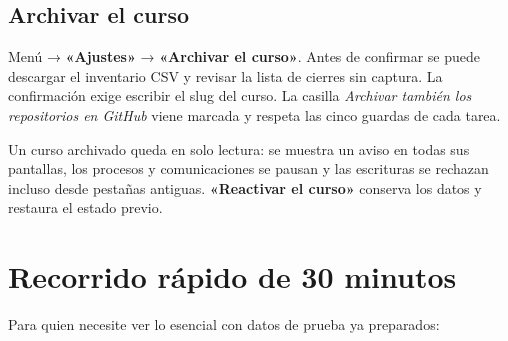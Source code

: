 \documentclass[11pt,a4paper]{article}
\newcommand{\ui}[1]{\textbf{«#1»}}        %
\begin{document}
\subsection{Archivar el curso}

Menú → \ui{Ajustes} → \ui{Archivar el curso}. Antes de confirmar se puede descargar el inventario CSV y revisar la lista de cierres sin captura. La confirmación exige escribir el slug del curso. La casilla \emph{Archivar también los repositorios en GitHub} viene marcada y respeta las cinco guardas de cada tarea.

Un curso archivado queda en solo lectura: se muestra un aviso en todas sus pantallas, los procesos y comunicaciones se pausan y las escrituras se rechazan incluso desde pestañas antiguas. \ui{Reactivar el curso} conserva los datos y restaura el estado previo.

\section{Recorrido rápido de 30 minutos}
\label{sec:rapido}

Para quien necesite ver lo esencial con datos de prueba ya preparados:
\end{document}
